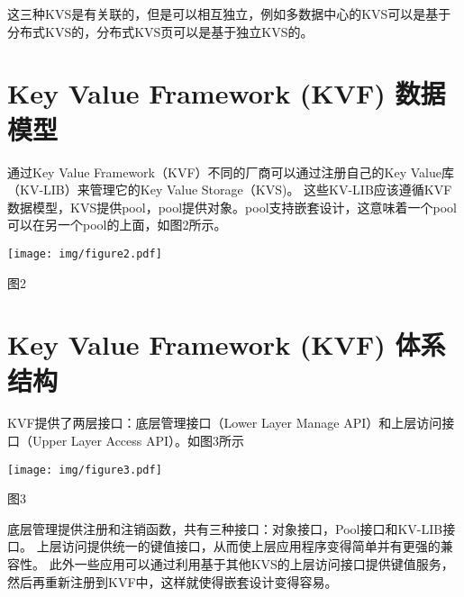 		这三种KVS是有关联的，但是可以相互独立，例如多数据中心的KVS可以是基于分布式KVS的，分布式KVS页可以是基于独立KVS的。
\section{Key Value Framework (KVF) 数据模型}\label{sec:KVF-model}
	通过Key Value Framework（KVF）不同的厂商可以通过注册自己的Key Value库（KV-LIB）来管理它的Key Value Storage（KVS)。 这些KV-LIB应该遵循KVF数据模型，KVS提供pool，pool提供对象。pool支持嵌套设计，这意味着一个pool可以在另一个pool的上面，如图2所示。
	\begin{center}
		\texttt{[image: img/figure2.pdf]}
	\end{center}
	\centerline {图2}

\section{Key Value Framework (KVF) 体系结构}\label{sec:KVF-Architecture}
	KVF提供了两层接口：底层管理接口（Lower Layer Manage API）和上层访问接口（Upper Layer Access API）。如图3所示
	\begin{center}
		\texttt{[image: img/figure3.pdf]}
	\end{center}
	\centerline {图3}
	底层管理提供注册和注销函数，共有三种接口：对象接口，Pool接口和KV-LIB接口。
	上层访问提供统一的键值接口，从而使上层应用程序变得简单并有更强的兼容性。
	此外一些应用可以通过利用基于其他KVS的上层访问接口提供键值服务，然后再重新注册到KVF中，这样就使得嵌套设计变得容易。




